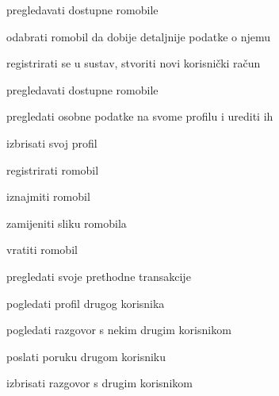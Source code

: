 			
			\begin{packed_enum}
				\item  {}
				
				\begin{packed_enum}
					
					\item pregledavati dostupne romobile
					\item odabrati romobil da dobije detaljnije podatke o njemu
					\item registrirati se u sustav, stvoriti novi korisnički račun
					
					
				\end{packed_enum}
			
				\item  {}
				
				\begin{packed_enum}
					\item pregledavati dostupne romobile
					\item pregledati osobne podatke na svome profilu i urediti ih 
					\item izbrisati svoj profil
					\item registrirati romobil
					\item iznajmiti romobil
					\item zamijeniti sliku romobila
					\item vratiti romobil
					\item pregledati svoje prethodne transakcije
					\item pogledati profil drugog korisnika
					\item pogledati razgovor s nekim drugim korisnikom
					\item poslati poruku drugom korisniku
					\item izbrisati razgovor s drugim korisnikom
					
				
					
				\end{packed_enum}
				\item  {}
				

\end{packed_enum}
